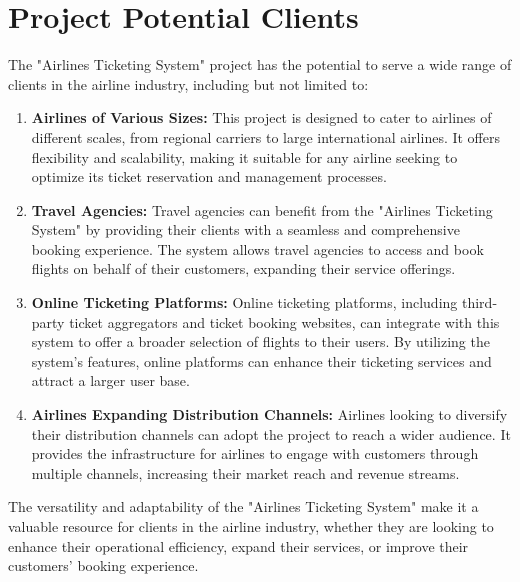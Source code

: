 \section{Project Potential Clients}
The "Airlines Ticketing System" project has the potential to serve a wide range of clients in the airline industry, including but not limited to:

\begin{enumerate}
    \item \textbf{Airlines of Various Sizes:} This project is designed to cater to airlines of different scales, from regional carriers to large international airlines. It offers flexibility and scalability, making it suitable for any airline seeking to optimize its ticket reservation and management processes.

    \item \textbf{Travel Agencies:} Travel agencies can benefit from the "Airlines Ticketing System" by providing their clients with a seamless and comprehensive booking experience. The system allows travel agencies to access and book flights on behalf of their customers, expanding their service offerings.

    \item \textbf{Online Ticketing Platforms:} Online ticketing platforms, including third-party ticket aggregators and ticket booking websites, can integrate with this system to offer a broader selection of flights to their users. By utilizing the system's features, online platforms can enhance their ticketing services and attract a larger user base.

    \item \textbf{Airlines Expanding Distribution Channels:} Airlines looking to diversify their distribution channels can adopt the project to reach a wider audience. It provides the infrastructure for airlines to engage with customers through multiple channels, increasing their market reach and revenue streams.


\end{enumerate}

The versatility and adaptability of the "Airlines Ticketing System" make it a valuable resource for clients in the airline industry, whether they are looking to enhance their operational efficiency, expand their services, or improve their customers' booking experience.


\clearpage